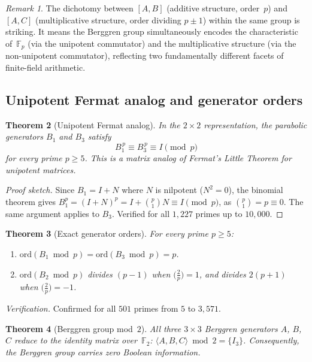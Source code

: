 \documentclass[12pt]{amsart}
\newtheorem{theorem}{Theorem}[section]
\theoremstyle{definition}
\theoremstyle{remark}
\newtheorem{remark}[theorem]{Remark}
\begin{document}
\begin{remark}
The dichotomy between $[A,B]$ (additive structure, order~$p$) and $[A,C]$
(multiplicative structure, order dividing $p\pm1$) within the same group is
striking.  It means the Berggren group simultaneously encodes the characteristic
of~$\mathbb{F}_{p}$ (via the unipotent commutator) and the multiplicative
structure (via the non-unipotent commutator), reflecting two fundamentally
different facets of finite-field arithmetic.
\end{remark}

\subsection{Unipotent Fermat analog and generator orders}

\begin{theorem}[Unipotent Fermat analog]\label{thm:unipotent-fermat}
In the $2\times2$ representation, the parabolic generators $B_{1}$ and $B_{3}$
satisfy
\[
  B_{1}^{\,p} \equiv B_{3}^{\,p} \equiv I \pmod{p}
\]
for every prime $p\ge5$.  This is a matrix analog of Fermat's Little Theorem
for unipotent matrices.
\end{theorem}

\begin{proof}[Proof sketch]
Since $B_{1}=I+N$ where $N$ is nilpotent ($N^{2}=0$), the binomial theorem gives
$B_{1}^{p}=(I+N)^{p}=I+\binom{p}{1}N\equiv I\pmod{p}$, as $\binom{p}{1}=p\equiv0$.
The same argument applies to $B_{3}$.  Verified for all $1{,}227$ primes up to $10{,}000$.
\end{proof}

\begin{theorem}[Exact generator orders]\label{thm:gen-orders}
For every prime $p\ge5$:
\begin{enumerate}[label=(\alph*)]
  \item $\mathrm{ord}(B_{1}\bmod p)=\mathrm{ord}(B_{3}\bmod p)=p$.
  \item $\mathrm{ord}(B_{2}\bmod p)$ divides $(p-1)$ when $\bigl(\frac{2}{p}\bigr)=1$,
    and divides $2(p+1)$ when $\bigl(\frac{2}{p}\bigr)=-1$.
\end{enumerate}
\end{theorem}

\noindent
\textit{Verification.}  Confirmed for all $501$ primes from $5$ to $3{,}571$.

\begin{theorem}[Berggren group mod~$2$]\label{thm:bg-mod2}
All three $3\times3$ Berggren generators $A$, $B$, $C$ reduce to the identity
matrix over~$\mathbb{F}_{2}$: $\langle A,B,C\rangle\bmod 2=\{I_{3}\}$.
Consequently, the Berggren group carries zero Boolean information.
\end{theorem}
\end{document}
